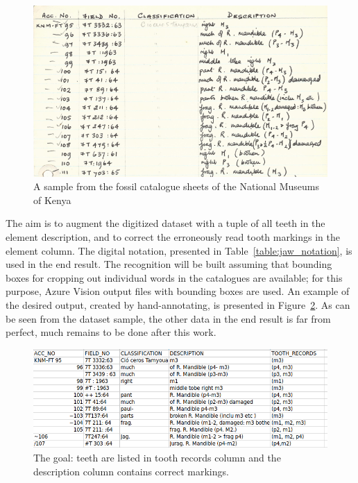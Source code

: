 \documentclass[english,twoside,openright]{UH_DS_MSc}
\begin{document}
\begin{figure}[ht]
    \centering
    \includegraphics*[scale=0.5]{images/cataloguesample3.png}
    \caption{A sample from the fossil catalogue sheets of the National Museums of Kenya}
    \label{image:cataloguesample}
\end{figure}

The aim is to augment the digitized dataset with a tuple of all teeth in the 
element description, and to correct the erroneously read tooth markings in the element column.
The digital notation, presented in Table~\ref{table:jaw_notation}, is used in the end result.
The recognition will be built assuming that bounding boxes for cropping out individual words in the 
catalogues are available; for this purpose, Azure Vision output files with bounding boxes
are used. An example of the desired output,
created by hand-annotating, is presented in Figure~\ref{image:goal}. 
As can be seen from the dataset sample, the other data in the end result is far from perfect, much remains to be done after this work.

\begin{figure}[ht]
    \centering
    \includegraphics*[scale=0.5]{images/goal.png}
    \caption{The goal: teeth are listed in tooth records column and the description column contains correct markings.}
    \label{image:goal}
\end{figure}
\end{document}
